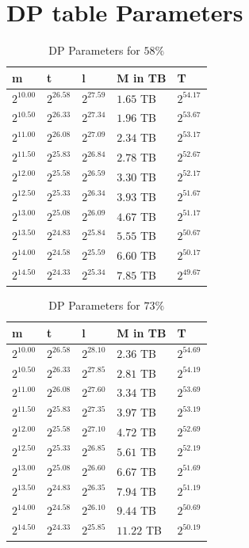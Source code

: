 \section{DP table Parameters}
\begin{table}[H]
  \centering
\begin{tabular}{lllll}
m & t & l & M in TB & T \\\hline
$2^{10.00}$ & $2^{26.58}$ & $2^{27.59}$ & $1.65$ TB & $2^{54.17}$ \\
$2^{10.50}$ & $2^{26.33}$ & $2^{27.34}$ & $1.96$ TB & $2^{53.67}$ \\
$2^{11.00}$ & $2^{26.08}$ & $2^{27.09}$ & $2.34$ TB & $2^{53.17}$ \\
$2^{11.50}$ & $2^{25.83}$ & $2^{26.84}$ & $2.78$ TB & $2^{52.67}$ \\
$2^{12.00}$ & $2^{25.58}$ & $2^{26.59}$ & $3.30$ TB & $2^{52.17}$ \\
$2^{12.50}$ & $2^{25.33}$ & $2^{26.34}$ & $3.93$ TB & $2^{51.67}$ \\
$2^{13.00}$ & $2^{25.08}$ & $2^{26.09}$ & $4.67$ TB & $2^{51.17}$ \\
$2^{13.50}$ & $2^{24.83}$ & $2^{25.84}$ & $5.55$ TB & $2^{50.67}$ \\
$2^{14.00}$ & $2^{24.58}$ & $2^{25.59}$ & $6.60$ TB & $2^{50.17}$ \\
$2^{14.50}$ & $2^{24.33}$ & $2^{25.34}$ & $7.85$ TB & $2^{49.67}$ \\
\end{tabular}
\caption{DP Parameters for $58\%$}
\end{table}
\begin{table}[H]
  \centering
\begin{tabular}{lllll}
m & t & l & M in TB & T \\\hline
$2^{10.00}$ & $2^{26.58}$ & $2^{28.10}$ & $2.36$ TB & $2^{54.69}$ \\
$2^{10.50}$ & $2^{26.33}$ & $2^{27.85}$ & $2.81$ TB & $2^{54.19}$ \\
$2^{11.00}$ & $2^{26.08}$ & $2^{27.60}$ & $3.34$ TB & $2^{53.69}$ \\
$2^{11.50}$ & $2^{25.83}$ & $2^{27.35}$ & $3.97$ TB & $2^{53.19}$ \\
$2^{12.00}$ & $2^{25.58}$ & $2^{27.10}$ & $4.72$ TB & $2^{52.69}$ \\
$2^{12.50}$ & $2^{25.33}$ & $2^{26.85}$ & $5.61$ TB & $2^{52.19}$ \\
$2^{13.00}$ & $2^{25.08}$ & $2^{26.60}$ & $6.67$ TB & $2^{51.69}$ \\
$2^{13.50}$ & $2^{24.83}$ & $2^{26.35}$ & $7.94$ TB & $2^{51.19}$ \\
$2^{14.00}$ & $2^{24.58}$ & $2^{26.10}$ & $9.44$ TB & $2^{50.69}$ \\
$2^{14.50}$ & $2^{24.33}$ & $2^{25.85}$ & $11.22$ TB & $2^{50.19}$ \\
\end{tabular}
 \caption{DP Parameters for $73\%$}
\end{table}

